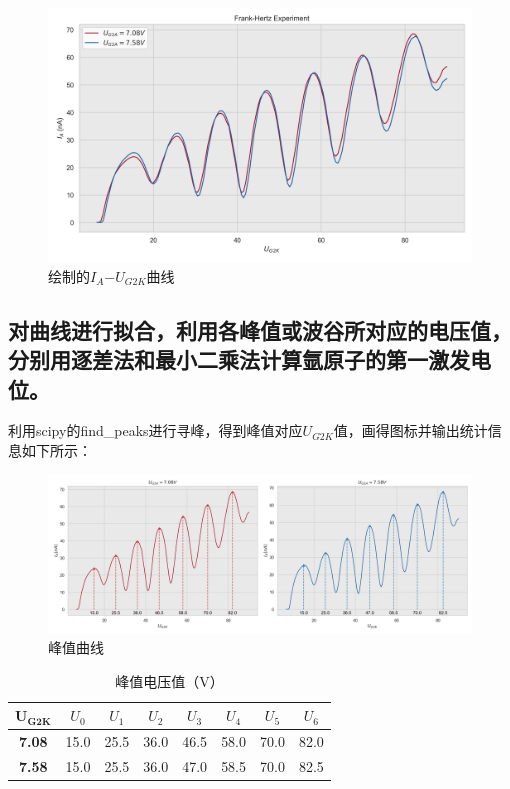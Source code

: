 \documentclass{ctexart}
\begin{document}
\begin{figure}[h]
    \centering
    \includegraphics[width=\textwidth]{data.png} %
    \caption{绘制的$I_A{-{}}U_{G2K}$曲线}
    \label{fig: data}
\end{figure}

\subsection{对曲线进行拟合，利用各峰值或波谷所对应的电压值，分别用逐差法和最小二乘法计算氩原子的第一激发电位。}

利用scipy的find\_peaks进行寻峰，得到峰值对应$U_{G2K}$值，画得图标并输出统计信息如下所示：

\begin{figure}[h]
    \centering
    \includegraphics[width=\textwidth]{data-2.png} %
    \caption{峰值曲线}
    \label{fig: data-2}
\end{figure}

\begin{table}[h]
    \centering
    \caption{峰值电压值（V）}
    \label{tab:peaks}
    \begin{tabular}{ c | c c c c c c c }
      \toprule
      $\mathbf{U_{G2K}}$  & $U_0$ & $U_1$ & $U_2$ & $U_3$ & $U_4$ & $U_5$ & $U_6$   \\
      \hline
      \textbf{7.08} & 15.0 & 25.5 & 36.0 & 46.5 & 58.0 & 70.0 & 82.0 \\
      \textbf{7.58} & 15.0 & 25.5 & 36.0 & 47.0 & 58.5 & 70.0 & 82.5 \\
      \bottomrule
    \end{tabular}
\end{table}
\end{document}
